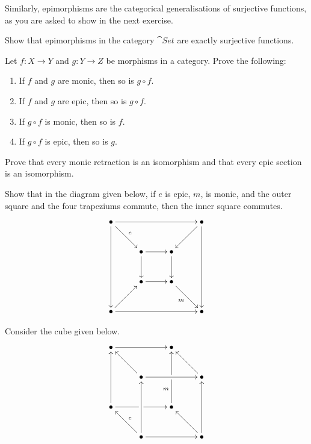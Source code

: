 Similarly, epimorphisms are the categorical generalisations of surjective functions, as you are asked to show in the next exercise.

\begin{Exercise}
Show that epimorphisms in the category $\cat{Set}$ are exactly surjective functions.
\end{Exercise}

\begin{Exercise}
Let $f \colon X \to Y$ and $g \colon Y \to Z$ be morphisms in a category. Prove the following:
\begin{enumerate}
\item If $f$ and $g$ are monic, then so is $g \circ f$.
\item If $f$ and $g$ are epic, then so is $g \circ f$.
\item If $g \circ f$ is monic, then so is $f$.
\item If $g \circ f$ is epic, then so is $g$.
\end{enumerate}
\end{Exercise}

\begin{Exercise}
Prove that every monic retraction is an isomorphism and that every epic section is an isomorphism.
\end{Exercise}

\begin{Exercise}
Show that in the diagram given below, if $e$ is epic, $m$, is monic, and the outer square and the four trapeziums commute, then the inner square commutes.
\begin{equation*}
\xymatrix@=2.5em{
\bullet \ar[ddd] \ar[rd]^e \ar[rrr] &&& \bullet \ar[ld] \ar[ddd] \\
& \bullet \ar[d] \ar[r] & \bullet \ar[d] & \\
& \bullet \ar[r] & \bullet \ar[rd]_m & \\
\bullet \ar[ru] \ar[rrr] &&& \bullet
}
\end{equation*}
\end{Exercise}

\begin{Exercise}
Consider the cube given below.
\begin{equation*}
\xymatrix@=2.5em{
\bullet \ar[rr] && \bullet & \\
& \bullet \ar[lu] \ar[rr] && \bullet \ar[lu] \\
\bullet \ar[uu] \ar[rr]|\hole && \bullet \ar[uu]|\hole^(0.3)m & \\
& \bullet \ar[lu]_e \ar[uu] \ar[rr] && \bullet \ar[lu] \ar[uu]
}
\end{equation*}
\end{Exercise}


